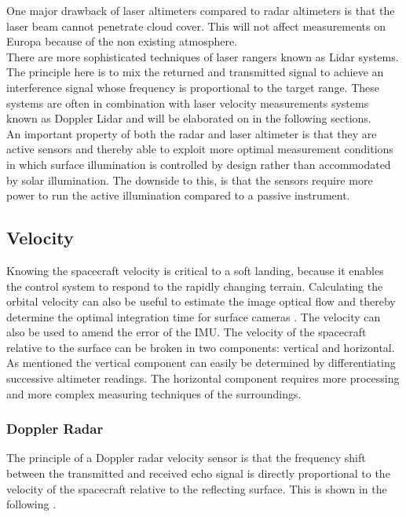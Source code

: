 \noindent
One major drawback of laser altimeters compared to radar altimeters is that the laser beam cannot penetrate cloud cover. This will not affect measurements on Europa because of the non existing atmosphere.\\ 

\noindent
There are more sophisticated techniques of laser rangers known as Lidar systems. The principle here is to mix the returned and transmitted signal to achieve an interference signal whose frequency is proportional to the target range. These systems are often in combination with laser velocity measurements systems known as Doppler Lidar and will be elaborated on in the following sections. \\

\noindent
An important property of both the radar and laser altimeter is that they are active sensors and thereby able to exploit more optimal measurement conditions in which surface illumination is controlled by design rather than accommodated by  solar illumination. The downside to this, is that the sensors require more power to run the active illumination compared to a passive instrument. 

\subsection{Velocity}

Knowing the spacecraft velocity is critical to a soft landing, because it enables the control system to respond to the rapidly changing terrain. Calculating the orbital velocity can also be useful to estimate the image optical flow and thereby determine the optimal integration time for surface cameras \cite{alessandro}. The velocity can also be used to amend the error of the IMU. The velocity of the spacecraft relative to the surface can be broken in two components: vertical and horizontal. As mentioned the vertical component can easily be determined by differentiating successive altimeter readings. The horizontal component requires more processing and more complex measuring techniques of the surroundings. 

\subsubsection{Doppler Radar}
The principle of a Doppler radar velocity sensor is that the frequency shift between the transmitted and received echo signal is directly proportional to the velocity of the spacecraft relative to the reflecting surface. This is shown in the following \cite{henningdoppler}. \\

